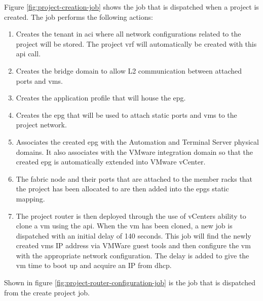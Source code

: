 Figure \ref{fig:project-creation-job} shows the job that is dispatched when a project is created. The job performs the following actions:
\begin{enumerate}
    \item Creates the tenant in \gls{aci} where all network configurations related to the project will be stored. The project \gls{vrf} will automatically be created with this \gls{api} call.
    \item Creates the bridge domain to allow L2 communication between attached ports and \gls{vm}s.
    \item Creates the application profile that will house the \gls{epg}.
    \item Creates the \gls{epg} that will be used to attach static ports and \gls{vm}s to the project network.
    \item Associates the created \gls{epg} with the Automation and Terminal Server physical domains. It also associates with the VMware integration domain so that the created \gls{epg} is automatically extended into VMware vCenter.
    \item The fabric node and their ports that are attached to the member racks that the project has been allocated to are then added into the \gls{epg}s static mapping.
    \item The project router is then deployed through the use of vCenters ability to clone a \gls{vm} using the \gls{api}. When the \gls{vm} has been cloned, a new job is dispatched with an initial delay of 140 seconds. This job will find the newly created \gls{vm}s IP address via VMWare guest tools and then configure the \gls{vm} with the appropriate network configuration. The delay is added to give the \gls{vm} time to boot up and acquire an IP from \gls{dhcp}. 
\end{enumerate}
Shown in figure \ref{fig:project-router-configuration-job} is the job that is dispatched from the create project job.
